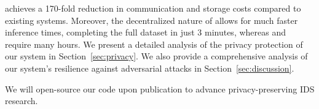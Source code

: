 \Sys achieves a 170-fold reduction in communication and storage costs compared to existing systems. Moreover, the decentralized nature of \Sys allows for much faster inference times, completing the full \optc dataset in just 3 minutes, whereas \flash and \kairos require many hours. We present a detailed analysis of the privacy protection of our system in Section~\ref{sec:privacy}. We also provide a comprehensive analysis of our system's resilience against adversarial attacks in Section~\ref{sec:discussion}. 



  We will open-source our code upon publication to advance privacy-preserving IDS research.




